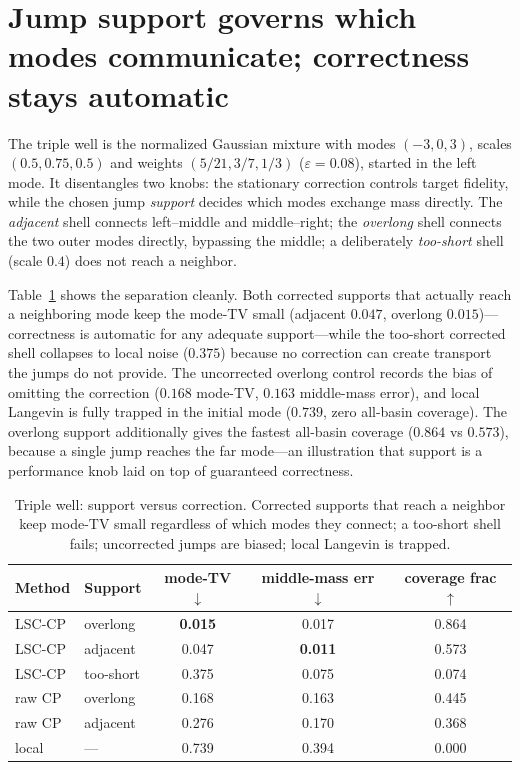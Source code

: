 \section{Jump support governs which modes communicate; correctness stays automatic}
\label{sec:move3}

The triple well is the normalized Gaussian mixture with modes $(-3,0,3)$, scales $(0.5,0.75,0.5)$
and weights $(5/21,3/7,1/3)$ ($\varepsilon=0.08$), started in the left mode. It disentangles two
knobs: the stationary correction controls target fidelity, while the chosen jump \emph{support}
decides which modes exchange mass directly. The \emph{adjacent} shell connects left--middle and
middle--right; the \emph{overlong} shell connects the two outer modes directly, bypassing the
middle; a deliberately \emph{too-short} shell (scale $0.4$) does not reach a neighbor.

Table~\ref{tab:move3} shows the separation cleanly. Both corrected supports that actually reach a
neighboring mode keep the mode-TV small (adjacent $0.047$, overlong $0.015$)---correctness is
automatic for any adequate support---while the too-short corrected shell collapses to local noise
($0.375$) because no correction can create transport the jumps do not provide. The uncorrected
overlong control records the bias of omitting the correction ($0.168$ mode-TV, $0.163$ middle-mass
error), and local Langevin is fully trapped in the initial mode ($0.739$, zero all-basin coverage).
The overlong support additionally gives the fastest all-basin coverage ($0.864$ vs $0.573$),
because a single jump reaches the far mode---an illustration that support is a performance knob laid
on top of guaranteed correctness.

\begin{table}[t]
\centering\small
\caption{Triple well: support versus correction. Corrected supports that reach a neighbor keep
mode-TV small regardless of which modes they connect; a too-short shell fails; uncorrected jumps are
biased; local Langevin is trapped.}
\label{tab:move3}
\begin{tabular}{llccc}
\toprule
Method & Support & mode-TV $\downarrow$ & middle-mass err $\downarrow$ & coverage frac $\uparrow$ \\
\midrule
LSC-CP & overlong & \textbf{0.015} & 0.017 & 0.864 \\
LSC-CP & adjacent & 0.047 & \textbf{0.011} & 0.573 \\
LSC-CP & too-short & 0.375 & 0.075 & 0.074 \\
raw CP & overlong & 0.168 & 0.163 & 0.445 \\
raw CP & adjacent & 0.276 & 0.170 & 0.368 \\
local  & ---      & 0.739 & 0.394 & 0.000 \\
\bottomrule
\end{tabular}
\end{table}
